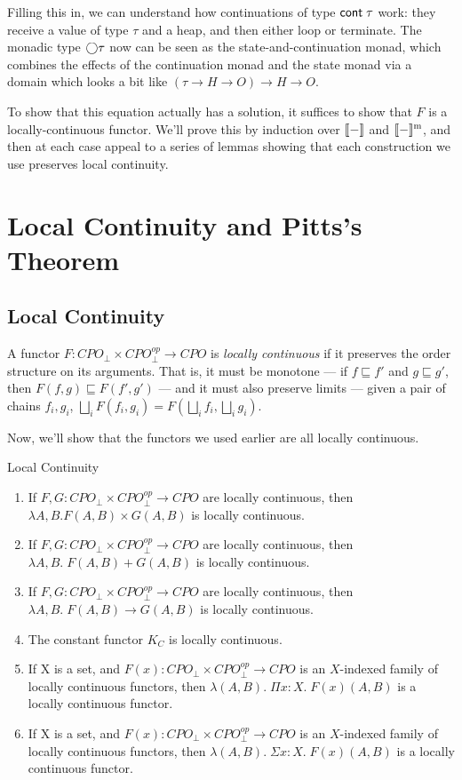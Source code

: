 Filling this in, we can understand how continuations of type
$\mbox{\textsf{{cont}}}\;{\tau}$ work: they receive a value of type $\tau$ and a heap,
and then either loop or terminate. The monadic type $\bigcirc{\tau}$ now
can be seen as the state-and-continuation monad, which combines the
effects of the continuation monad and the state monad via a domain 
which looks a bit like $(\tau \to H \to O) \to H \to O$. 

To show that this equation actually has a solution, it suffices to 
show that $F$ is a locally-continuous functor. We'll prove this by 
induction over $[\![{-}]\!]$ and $[\![{-}]\!]^{\mathrm{m}}$, and then at each
case appeal to a series of lemmas showing that each construction we
use preserves local continuity. 

\section{Local Continuity and Pitts's Theorem}

\subsection{Local Continuity}

A functor $F : CPO_\bot \times CPO^{op}_\bot \to CPO$ is \emph{locally
  continuous} if it preserves the order structure on its arguments.
That is, it must be monotone --- if $f \sqsubseteq f'$ and $g
\sqsubseteq g'$, then $F(f, g) \sqsubseteq F(f', g')$ --- and it
must also preserve limits --- given a pair of chains $f_i, g_i$, 
$\bigsqcup_i F(f_i, g_i) = F(\bigsqcup_i f_i, \bigsqcup_i g_i)$. 

Now, we'll show that the functors we used earlier are all locally 
continuous. 

\begin{lemma}{Local Continuity}
\begin{enumerate}
\item If $F,G : CPO_\bot \times CPO^{op}_\bot \to CPO$ are locally continuous,
      then $\lambda A,B. F(A,B) \times G(A,B)$ is locally continuous.  
\item If $F,G : CPO_\bot \times CPO^{op}_\bot \to CPO$ are locally continuous,
      then $\lambda A,B.\; F(A,B) + G(A,B)$ is locally continuous.  
\item If $F,G : CPO_\bot \times CPO^{op}_\bot \to CPO$ are locally continuous,
      then $\lambda A,B.\;F(A,B) \to G(A,B)$ is locally continuous.  
\item The constant functor $K_C$ is locally continuous. 
\item If X is a set, and $F(x) : CPO_\bot \times CPO^{op}_\bot \to CPO$ is an
      $X$-indexed family of locally continuous functors, then 
      $\lambda (A,B).\; \Pi x:X.\;F(x)(A,B)$ is a locally continuous functor. 
\item If X is a set, and $F(x) : CPO_\bot \times CPO^{op}_\bot \to CPO$ is an
      $X$-indexed family of locally continuous functors, then 
      $\lambda (A,B).\;\Sigma x:X.\;F(x)(A,B)$ is a locally continuous functor. 
\end{enumerate}
\end{lemma}
 
